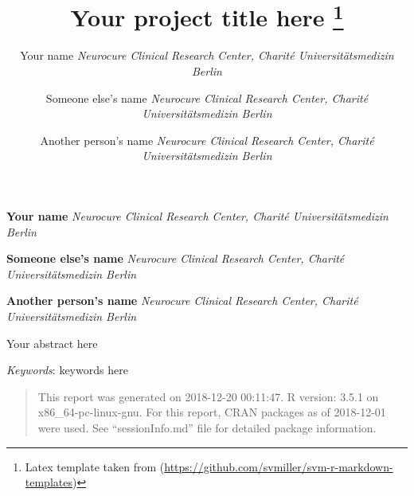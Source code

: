 \documentclass[11pt,]{article}
\title{Your project title here \thanks{Latex template taken from
(\url{https://github.com/svmiller/svm-r-markdown-templates})}  }
\author{\Large Your name\vspace{0.05in} \newline\normalsize\emph{Neurocure Clinical Research Center, Charité Universitätsmedizin Berlin}   \and \Large Someone else's name\vspace{0.05in} \newline\normalsize\emph{Neurocure Clinical Research Center, Charité Universitätsmedizin Berlin}   \and \Large Another person's name\vspace{0.05in} \newline\normalsize\emph{Neurocure Clinical Research Center, Charité Universitätsmedizin Berlin}  }
\date{}
\newcommand*{\authorfont}{\fontfamily{phv}\selectfont}
\renewenvironment{abstract}
 {{%
    \setlength{\leftmargin}{0mm}
    \setlength{\rightmargin}{\leftmargin}%
  }%
  \relax}
 {\endlist}
\begin{document}
	
%

{%
\setlength{\parindent}{0pt}
\thispagestyle{plain}
{\fontsize{18}{20}\selectfont\raggedright 
\maketitle  %

}

{
   \vskip 13.5pt\relax \normalsize\fontsize{11}{12} 
\textbf{\authorfont Your name} \hskip 15pt \emph{\small Neurocure Clinical Research Center, Charité Universitätsmedizin Berlin}   \par \textbf{\authorfont Someone else's name} \hskip 15pt \emph{\small Neurocure Clinical Research Center, Charité Universitätsmedizin Berlin}   \par \textbf{\authorfont Another person's name} \hskip 15pt \emph{\small Neurocure Clinical Research Center, Charité Universitätsmedizin Berlin}   

}

}








\begin{abstract}

    \hbox{\vrule height .2pt width 39.14pc}

    \vskip 8.5pt %

\noindent Your abstract here


\vskip 8.5pt \noindent \emph{Keywords}: keywords here \par

    \hbox{\vrule height .2pt width 39.14pc}



\end{abstract}


\vskip 6.5pt


\noindent \doublespacing \begin{quote}
This report was generated on 2018-12-20 00:11:47. R version: 3.5.1 on
x86\_64-pc-linux-gnu. For this report, CRAN packages as of 2018-12-01
were used. See ``sessionInfo.md'' file for detailed package information.
\end{quote}
\end{document}
